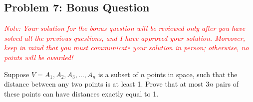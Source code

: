 \documentclass{article}
\begin{document}
\subsection*{Problem 7: Bonus Question}
\textcolor{red}{\textit{Note: Your solution for the bonus question will be reviewed only after you have solved all the previous questions, and I have approved your solution. Moreover, keep in mind that you must communicate your solution in person; otherwise, no points will be awarded!}}

Suppose $V = {A_1, A_2, A_3, \ldots, A_n}$ is a subset of $n$ points in space, such that the distance between any two points is at least 1. Prove that at most $3n$ pairs of these points can have distances exactly equal to 1.
\end{document}
